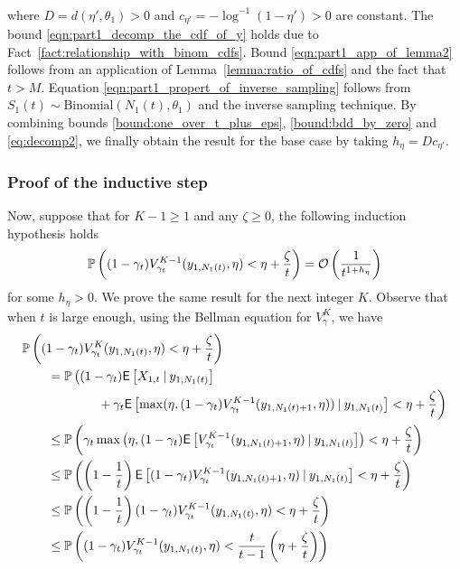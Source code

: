 \begin{myproof}[Proof.]
\begin{align}
	\end{align}
	where $D = d(\eta',\theta_1) > 0$ and $c_{\eta'} = -\log^{-1}(1-\eta') > 0$ are constant. The bound \eqref{eqn:part1_decomp_the_cdf_of_y} holds due to Fact~\eqref{fact:relationship_with_binom_cdfs}. Bound \eqref{eqn:part1_app_of_lemma2} follows from an application of Lemma~\ref{lemma:ratio_of_cdfs} and the fact that $t > M$. Equation \eqref{eqn:part1_propert_of_inverse_sampling} follows from $S_1(t) \sim \text{Binomial}(N_1(t), \theta_1)$ and the inverse sampling technique. By combining bounds \eqref{bound:one_over_t_plus_eps}, \eqref{bound:bdd_by_zero} and \eqref{eq:decomp2}, we finally obtain the result for the base case by taking $h_\eta = Dc_{\eta'}$.

	\subsubsection*{Proof of the inductive step}
	 Now, suppose that for $K-1 \ge 1$ and any $\zeta \ge 0$,  the following induction hypothesis holds
	\[
	\P{(1-\gamma_t)V^{K-1}_{\gamma_t}(y_{1,N_1(t)}, \eta) < \eta + \frac{\zeta}{t}} = \mathcal{O}\left(\frac{1}{t^{1 + h_\eta}}\right)
	\]
	for some $h_\eta > 0$. We prove the same result for the next integer $K$. Observe that when $t$ is large enough, using the Bellman equation for $V^K_\gamma$, we have
	\begin{align}
	&\P{(1-\gamma_t)V^K_{\gamma_t}(y_{1,N_1(t)}, \eta) < \eta + \frac{\zeta}{t}} \nonumber  \\
	&\qquad = \mathbb{P}\left((1-\gamma_t)\Ee{X_{1,t} \given y_{1,N_1(t)}}  \right. \nonumber\\
	&\hspace{6em} + \gamma_t \Ee{\max(\eta, (1-\gamma_t)V^{K-1}_{\gamma_t}(y_{1,N_1(t)+1}, \eta)) \given y_{1,N_1(t)}} < \eta + \frac{\zeta}{t}\bigg) \label{eq:appl_of_lemma_9} \\
	& \qquad \le \P{ \gamma_t \max\left(\eta, (1-\gamma_t)\Ee{V^{K-1}_{\gamma_{t}}(y_{1,N_1(t)+1}, \eta ) \given y_{1,N_1(t)}}\right)< \eta + \frac{\zeta}{t}} \label{ineq:appl_jensens} \\
	& \qquad \le \P{ \left(1-\frac{1}{t}\right) \Ee{(1-\gamma_t)V^{K-1}_{\gamma_{t}}(y_{1,N_1(t)+1}, \eta) \given y_{1,N_1(t)} }< \eta + \frac{\zeta}{t}} \nonumber \\
	& \qquad \le \P{\left(1-\frac{1}{t}\right)(1-\gamma_t) V^{K-1}_{\gamma_{t}}(y_{1,N_1(t)}, \eta)< \eta  + \frac{\zeta}{t}} \label{ineq:missing_step} \\
	& \qquad \le \P{ (1-\gamma_t)V^{K-1}_{\gamma_{t}}(y_{1,N_1(t)}, \eta)< \frac{t}{t-1}\left(\eta +  \frac{\zeta}{t}}\right) \nonumber \\

\end{align}
\end{myproof}
